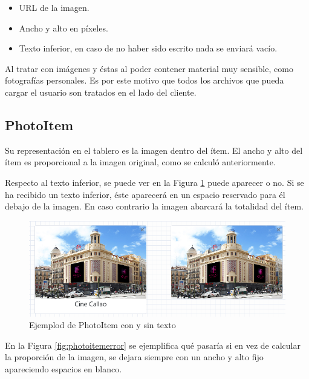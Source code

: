 \begin{itemize}
	\item URL de la imagen.
	\item Ancho y alto en píxeles.
	\item Texto inferior, en caso de no haber sido escrito nada se enviará vacío.
\end{itemize}



Al tratar con imágenes y éstas al poder contener material muy sensible, como fotografías personales. Es por este motivo que todos los archivos que pueda cargar el usuario son tratados en el lado del cliente. 

\subsection{PhotoItem}

Su representación en el tablero es la imagen dentro del ítem. El ancho y alto del ítem es proporcional a la imagen original, como se calculó anteriormente. 

Respecto al texto inferior, se puede ver en la Figura \ref{fig:photoitemtexto} puede aparecer o no. Si se ha recibido un texto inferior, éste aparecerá en un espacio reservado para él debajo de la imagen. En caso contrario la imagen abarcará la totalidad del ítem.

\begin{figure}[h!]
	\centering
	\includegraphics[width=0.7\linewidth]{Imagenes/Bitmap/photoItemTexto}
	\caption{Ejemplod de PhotoItem con y sin texto}
	\label{fig:photoitemtexto}
\end{figure}


En la Figura \ref{fig:photoitemerror} se ejemplifica qué pasaría si en vez de calcular la proporción de la imagen, se dejara siempre con un ancho y alto fijo apareciendo espacios en blanco.

